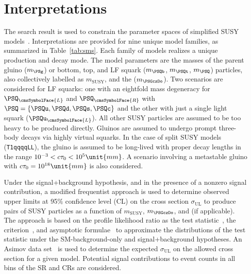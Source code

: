 
\section{Interpretations}
\label{sec:interpretations}

The search result is used to constrain the parameter spaces of
simplified SUSY models~\cite{Alwall:2008ag, Alwall:2008va,
  sms}. Interpretations are provided for nine unique model families,
as summarized in Table~\ref{tab:sms}. Each family of models realizes a
unique production and decay mode. The model parameters are the masses
of the parent gluino ($m_\PSg$) or bottom, top, and LF squark
($m_{\PSQb}$, $m_{\PSQt}$, $m_{\PSQ}$) particles, also collectively
labelled as $m_\text{SUSY}$, and the \PSGczDo ($m_{\PSGczDo}$). Two
scenarios are considered for LF squarks: one with an eightfold mass
degeneracy for $\PSQ_\cmsSymbolFace{L}$ and $\PSQ_\cmsSymbolFace{R}$
with $\PSQ = \{\PSQu, \PSQd, \PSQs, \PSQc\}$ and the other with just a
single light squark ($\PSQu_\cmsSymbolFace{L}$). All other SUSY
particles are assumed to be too heavy to be produced directly. Gluinos
are assumed to undergo prompt three-body decays via highly virtual
squarks. In the case of split SUSY models (\texttt{T1qqqqLL}), the
gluino is assumed to be long-lived with proper decay lengths in the
range $10^{-3} < \ctau < 10^{5}\unit{mm}$. A scenario involving a
metastable gluino with $\ctau = 10^{18}\unit{mm}$ is also considered.

Under the signal+background hypothesis, and in the presence of a
nonzero signal contribution, a modified frequentist approach is used
to determine observed upper limits at 95\% confidence level (CL) on
the cross section $\sigma_\text{UL}$ to produce pairs of SUSY
particles as a function of $m_\text{SUSY}$, $m_{\PSGczDo}$, and \ctau
(if applicable). The approach is based on the %
profile likelihood ratio as the test
statistic~\cite{CMS-NOTE-2011-005}, the \cls criterion~\cite{junk,
  read}, and asymptotic formulae~\cite{Cowan:2010js} to approximate
the distributions of the test statistic under the SM-background-only
and signal+background hypotheses.  An Asimov data
set~\cite{Cowan:2010js} is used to determine the expected
$\sigma_\text{UL}$ on the allowed cross section for a given
model. Potential signal contributions to event counts in all bins of
the SR and CRs are considered.

